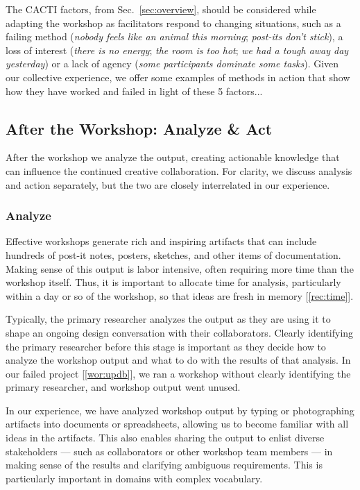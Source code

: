 The CACTI factors, from Sec.~\ref{sec:overview}, should be considered while adapting the workshop as facilitators respond to changing situations, such as a failing method (\emph{nobody feels like an animal this morning}; \emph{post-its don't stick}), a loss of interest (\emph{there is no energy}; \emph{the room is too hot}; \emph{we had a tough away day yesterday}) or a lack of agency (\emph{some participants dominate some tasks}). Given our collective experience, we offer some examples of methods in action that show how they have worked and failed in light of these 5 factors...

\subsection{After the Workshop: Analyze \& Act}

After the workshop we analyze the output, creating actionable knowledge that can influence the continued creative collaboration. For clarity, we discuss analysis and action separately, but the two are closely interrelated in our experience.

\subsubsection{Analyze}

Effective workshops generate rich and inspiring artifacts that can include hundreds of post-it notes, posters, sketches, and other items of documentation. Making sense of this output is labor intensive, often requiring more time than the workshop itself. Thus, it is important to allocate time for analysis, particularly within a day or so of the workshop, so that ideas are fresh in memory [\ref{rec:time}].

Typically, the primary researcher analyzes the output as they are using it to shape an ongoing design conversation with their collaborators. Clearly identifying the primary researcher before this stage is important as they decide how to analyze the workshop output and what to do with the results of that analysis. In our failed project [\ref{wor:updb}], we ran a workshop without clearly identifying the primary researcher, and workshop output went unused.

In our experience, we have analyzed workshop output by typing or photographing artifacts into documents or spreadsheets, allowing  us to become familiar with all ideas in the artifacts. This also enables sharing the output to enlist diverse stakeholders --- such as collaborators or other workshop team members --- in making sense of the results and clarifying ambiguous requirements. This is particularly important in domains with complex vocabulary.

